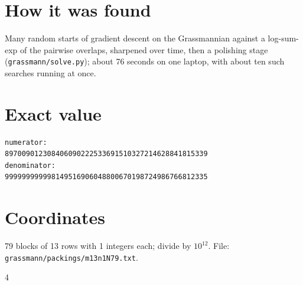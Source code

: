 \documentclass[11pt,a4paper]{article}
\begin{document}
\section{How it was found}
Many random starts of gradient descent on the Grassmannian against a log-sum-exp of the pairwise overlaps, sharpened over time, then a polishing stage (\texttt{grassmann/solve.py}); about 76 seconds on one laptop, with about ten such searches running at once.


\appendix
\section{Exact value}
{\small
\begin{verbatim}
numerator:
897009012308406090222533691510327214628841815339
denominator:
999999999998149516906048800670198724986766812335
\end{verbatim}}

\section{Coordinates}
79 blocks of 13 rows with 1 integers each; divide by $10^{12}$. File: \texttt{grassmann/packings/m13n1N79.txt}.
{\tiny
\begin{multicols}{4}
\end{multicols}}
\end{document}
